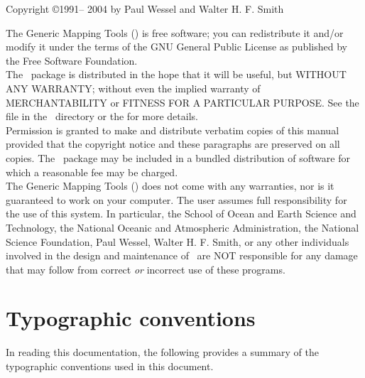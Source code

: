 \begin{center}
Copyright \copyright 1991-- 2004 by Paul Wessel and Walter H. F. Smith
\end{center}

\vspace{\baselineskip}

The Generic Mapping Tools (\GMT) is free software; you can redistribute
it and/or modify it under the terms of the GNU General Public License
as published by the Free Software Foundation. \\

The \GMT\ package is distributed in the hope that it will be useful, but
WITHOUT ANY WARRANTY; without even the implied warranty of
MERCHANTABILITY or FITNESS FOR A PARTICULAR PURPOSE.  See the
file  in the \GMT\ directory or the
for more details. \\

Permission is granted to make and distribute verbatim copies of this
manual provided that the copyright notice and these paragraphs are
preserved on all copies.  The \GMT\ package may be included in a bundled
distribution of software for which a reasonable fee may be charged. \\

The Generic Mapping Tools (\GMT) does not come with any warranties,
nor is it guaranteed to work on your computer.  The user assumes full
responsibility for the use of this system. In particular, the School of
Ocean and Earth Science and Technology, the National Oceanic and
Atmospheric Administration, the National Science Foundation,
Paul Wessel, Walter H. F. Smith, or any other individuals involved in
the design and maintenance of \GMT\ are NOT responsible for any damage
that may follow from correct \emph{or} incorrect use of these programs.


\chapter*{Typographic conventions}

In reading this documentation, the following provides a summary of
the typographic conventions used in this document.

